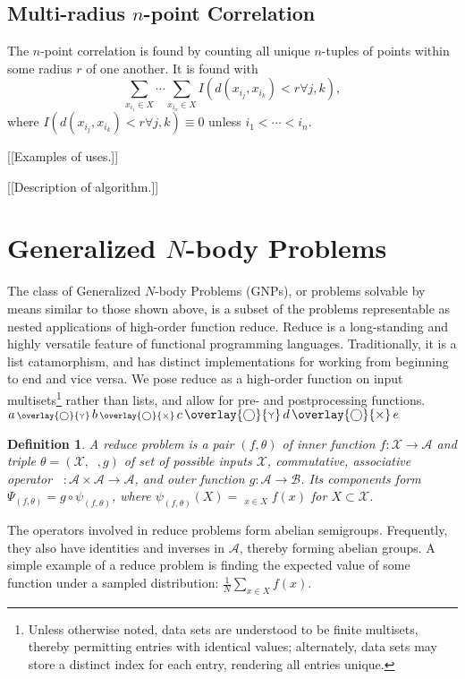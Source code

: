 \documentclass{article}
\newtheorem{definition} {Definition}
\newcommand{\OpSym}{\mathrm{O\!p}}
\newcommand{\opsym}{{\scriptstyle \mathrm{o\!p}}}
\newcommand{\OpCurry}[3][]{\mathop{\OpSym^{#1}_{#2}{#3}}}
\newcommand{\opcurry}[3][]{\mathop{\opsym^{#1}_{#2}{#3}}}
\newcommand{\Op}[2][]{\OpCurry[#1]{#2}{}}
\newcommand{\op}[2][]{\opcurry[#1]{#2}{}}
\newcommand{\oy}{\mathop{\scriptstyle \overlay{\bigcirc}{\Ydown}}\nolimits}
\newcommand{\ox}{\mathop{\scriptstyle \overlay{\bigcirc}{\times}}\nolimits}
\newcommand{\bigoy}{\mathop{\overlay{\bigcirc}{\Ydown}}}
\newcommand{\bigox}{\mathop{\overlay{\bigcirc}{\times}}}
\newcommand{\comp}{\mathop{\circ}\nolimits}
\begin{document}
\subsection{Multi-radius $n$-point Correlation}

The $n$-point correlation is found by counting all unique $n$-tuples
of points within some radius $r$ of one another.  It is found with
\[
\sum_{x_{i_1} \in X} \cdots \sum_{x_{i_n} \in X} I(d(x_{i_j},x_{i_k}) < r \forall j,k),
\]
where $I(d(x_{i_j},x_{i_k}) < r \forall j,k) \equiv 0$ unless $i_1 <
\cdots < i_n$.

[[Examples of uses.]]

[[Description of algorithm.]]

\section{Generalized $N$-body Problems}

The class of Generalized $N$-body Problems (GNPs), or problems
solvable by means similar to those shown above, is a subset of the
problems representable as nested applications of high-order function
reduce.  Reduce is a long-standing and highly versatile feature of
functional programming languages.  Traditionally, it is a list
catamorphism, and has distinct implementations for working from
beginning to end and vice versa.  We pose reduce as a high-order
function on input multisets\footnote{Unless otherwise noted, data sets
are understood to be finite multisets, thereby permitting entries with
identical values; alternately, data sets may store a distinct index
for each entry, rendering all entries unique.} rather than lists, and
allow for pre- and postprocessing functions.  $a \oy b \ox c \bigoy d \bigox e$
\begin{definition}
  A {\em reduce problem} is a pair $(f,\theta)$ of inner function $f
  \colon \mathcal{X} \to \mathcal{A}$ and triple $\theta =
  (\mathcal{X},\op{},g)$ of set of possible inputs $\mathcal{X}$,
  commutative, associative operator $\op{} \colon \mathcal{A} \times
  \mathcal{A} \to \mathcal{A}$, and outer function $g \colon
  \mathcal{A} \to \mathcal{B}$.  Its components form
  $\Psi_{(f,\theta)} = g \comp \psi_{(f,\theta)}$, where
  $\psi_{(f,\theta)}(X) = \Op{}_{x \in X} f(x)$ for $X \subset
  \mathcal{X}$.
\end{definition}
\noindent The operators involved in reduce problems form abelian
semigroups.  Frequently, they also have identities and inverses in
$\mathcal{A}$, thereby forming abelian groups.  A simple example of a
reduce problem is finding the expected value of some function under a
sampled distribution: $\frac{1}{N} \sum_{x \in X} f(x)$.
\end{document}
